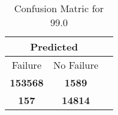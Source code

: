 \begin{table}[] 
\caption{Confusion Matric for 99.0} 
\label{Table: Prediction Accuracy-None99.0SVMEKF-ignoreReflection-Reflection} 
\centering 
\begin{tabular} 
 {@{}ccc@{}} 
\toprule 
\multicolumn{2}{c}{\textbf{Predicted}}
 \\ \midrule 
\multicolumn{1}{|c|}{Failure} & 
\multicolumn{1}{c|}{No Failure}
 \\ \midrule 
\multicolumn{1}{|c|}{\color{green}\textbf{153568}} & 
\multicolumn{1}{c|}{\color{red}\textbf{1589}}
 \\ \midrule 
\multicolumn{1}{|c|}{\color{red}\textbf{157}} & 
\multicolumn{1}{c|}{\color{green}\textbf{14814}}
 \\ \bottomrule 
\end{tabular} 
\end{table} 
